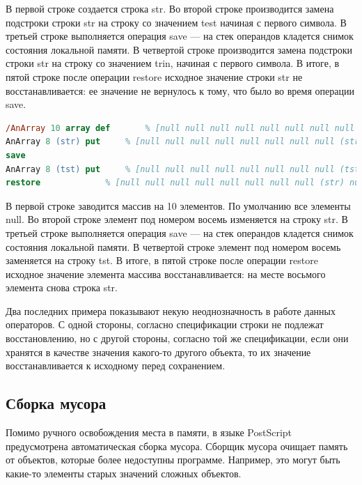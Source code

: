 В первой строке создается строка str. Во второй строке производится замена подстроки строки str на строку со значением test начиная с первого символа.  В третьей строке выполняется операция save --- на стек операндов кладется снимок состояния локальной памяти. В четвертой строке производится замена подстроки строки str на строку со значением trin, начиная с первого символа. В итоге, в пятой строке после операции restore исходное значение строки str не восстанавливается: ее значение не вернулось к тому, что было во время операции save. 


\begin{lstlisting}[label=PostScript-example2,caption=Изменение значения массива, language = PostScript]
/AnArray 10 array def		% [null null null null null null null null null null]
AnArray 8 (str) put		% [null null null null null null null null (str) null]
save
AnArray 8 (tst) put		% [null null null null null null null null (tst) null]
restore				% [null null null null null null null null (str) null]
\end{lstlisting}


В первой строке заводится массив на 10 элементов. По умолчанию все элементы null. Во второй строке элемент под номером восемь изменяется на строку str.  В третьей строке выполняется операция save --- на стек операндов кладется снимок состояния локальной памяти. В четвертой строке элемент под номером восемь заменяется на строку tst. В итоге, в пятой строке после операции restore исходное значение элемента массива восстанавливается: на месте восьмого элемента снова строка str. 

Два последних примера показывают некую неоднозначность в работе данных операторов. С одной стороны, согласно спецификации строки не подлежат восстановлению, но с другой стороны, согласно той же спецификации, если они хранятся в качестве значения какого-то другого объекта, то их значение восстанавливается к исходному перед сохранением.

\subsection{Сборка мусора}
Помимо ручного освобождения места в памяти, в языке PostScript предусмотрена автоматическая сборка мусора. Сборщик мусора очищает память от объектов, которые более недоступны программе. Например, это могут быть какие-то элементы старых значений сложных объектов.

